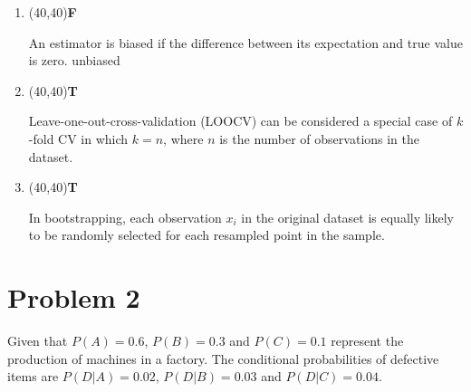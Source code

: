 \documentclass[11pt,twoside]{article}
\newcommand{\?}{\stackrel{?}{=}}
\newcommand{\bl}{\color{blue}}
\begin{document}
\begin{enumerate}[\bf (i)]
  \smallskip
  
\item \hfill
  \begin{minipage}{.1\linewidth}
    \framebox(40,40){\bf\bl F} %
  \end{minipage}\quad
  \begin{minipage}{.85\linewidth}
    An estimator is biased if the difference between its expectation and true value is zero. {\bl unbiased}
  \end{minipage}

  \smallskip

\item \hfill
  \begin{minipage}{.1\linewidth}
    \framebox(40,40){\bf\bl T}%
  \end{minipage}\quad
  \begin{minipage}{.85\linewidth}
    Leave-one-out-cross-validation (LOOCV) can be considered a special case of $k$-fold CV in which $k = n$, where $n$ is the number of observations in the dataset.
  \end{minipage}

\smallskip



\item \hfill
  \begin{minipage}{.1\linewidth}
    \framebox(40,40){\bf\bl T} %
  \end{minipage}\quad
  \begin{minipage}{.85\linewidth}
    In bootstrapping, each observation $x_{i}$ in the original dataset is equally likely to be randomly selected for  each resampled point in the  sample.
  \end{minipage}


\end{enumerate}


\section*{Problem 2 }
Given that $P (A) = 0.6$, $P (B) = 0.3$ and $P(C) = 0.1$ represent the production of machines in a
factory. The conditional probabilities of defective items are $P(D|A) = 0.02$, $P (D|B) = 0.03$ and
$P (D|C) = 0.04$.
\end{document}
